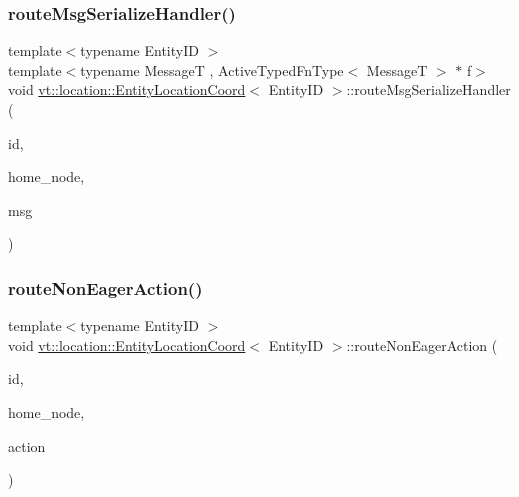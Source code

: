 \mbox{\label{structvt_1_1location_1_1_entity_location_coord_ad0465263fbb33cf63819fd2c86f10cec}} 
\subsubsection{\texorpdfstring{route\+Msg\+Serialize\+Handler()}{routeMsgSerializeHandler()}}
{\footnotesize\ttfamily template$<$typename Entity\+ID $>$ \\
template$<$typename MessageT , Active\+Typed\+Fn\+Type$<$ Message\+T $>$ $\ast$ f$>$ \\
void \hyperlink{structvt_1_1location_1_1_entity_location_coord}{vt\+::location\+::\+Entity\+Location\+Coord}$<$ Entity\+ID $>$\+::route\+Msg\+Serialize\+Handler (\begin{DoxyParamCaption}\item[{Entity\+ID const \&}]{id,  }\item[{\hyperlink{namespacevt_a866da9d0efc19c0a1ce79e9e492f47e2}{Node\+Type} const \&}]{home\+\_\+node,  }\item[{\hyperlink{namespacevt_ab2b3d506ec8e8d1540aede826d84a239}{Msg\+Shared\+Ptr}$<$ MessageT $>$}]{msg }\end{DoxyParamCaption})}

\mbox{\label{structvt_1_1location_1_1_entity_location_coord_ae7c1ec3412f2a16ea3f40d6bb39f23ca}} 
\subsubsection{\texorpdfstring{route\+Non\+Eager\+Action()}{routeNonEagerAction()}}
{\footnotesize\ttfamily template$<$typename Entity\+ID $>$ \\
void \hyperlink{structvt_1_1location_1_1_entity_location_coord}{vt\+::location\+::\+Entity\+Location\+Coord}$<$ Entity\+ID $>$\+::route\+Non\+Eager\+Action (\begin{DoxyParamCaption}\item[{Entity\+ID const \&}]{id,  }\item[{\hyperlink{namespacevt_a866da9d0efc19c0a1ce79e9e492f47e2}{Node\+Type} const \&}]{home\+\_\+node,  }\item[{\hyperlink{namespacevt_a0436cb2d620dcbb21b5b49cd9c9c4749}{Action\+Node\+Type}}]{action }\end{DoxyParamCaption})}

